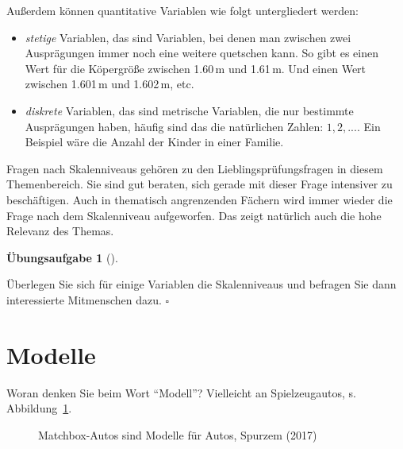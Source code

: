 \documentclass[
  letterpaper,
  twoside,
  open=any]{scrbook}
\providecommand{\tightlist}{%
  \setlength{\itemsep}{0pt}\setlength{\parskip}{0pt}}\usepackage{longtable,booktabs,array}
\theoremstyle{definition}
\theoremstyle{definition}
\newtheorem{exercise}{Übungsaufgabe}[chapter]
\theoremstyle{definition}
\theoremstyle{remark}
\begin{document}
Außerdem können quantitative Variablen wie folgt untergliedert werden:

\begin{itemize}
\tightlist
\item
  \emph{stetige} Variablen, das sind Variablen, bei denen man zwischen
  zwei Ausprägungen immer noch eine weitere quetschen kann. So gibt es
  einen Wert für die Köpergröße zwischen 1.60\,m und 1.61\,m. Und einen
  Wert zwischen 1.601\,m und 1.602\,m, etc.
\item
  \emph{diskrete} Variablen, das sind metrische Variablen, die nur
  bestimmte Ausprägungen haben, häufig sind das die natürlichen Zahlen:
  \(1,2,...\). Ein Beispiel wäre die Anzahl der Kinder in einer Familie.
\end{itemize}

Fragen nach Skalenniveaus gehören zu den Lieblingsprüfungsfragen in
diesem Themenbereich. Sie sind gut beraten, sich gerade mit dieser Frage
intensiver zu beschäftigen. Auch in thematisch angrenzenden Fächern wird
immer wieder die Frage nach dem Skalenniveau aufgeworfen. Das zeigt
natürlich auch die hohe Relevanz des Themas.

\begin{exercise}[]\protect\hypertarget{exr-skalenniveaus}{}\label{exr-skalenniveaus}

Überlegen Sie sich für einige Variablen die Skalenniveaus und befragen
Sie dann interessierte Mitmenschen dazu. \(\square\)

\end{exercise}

\section{Modelle}\label{modelle}

Woran denken Sie beim Wort \enquote{Modell}? Vielleicht an
Spielzeugautos, s. Abbildung~\ref{fig-matchbox}.

\begin{figure}


\caption{\label{fig-matchbox}Matchbox-Autos sind Modelle für Autos,
Spurzem (2017)}

\end{figure}%
\end{document}
